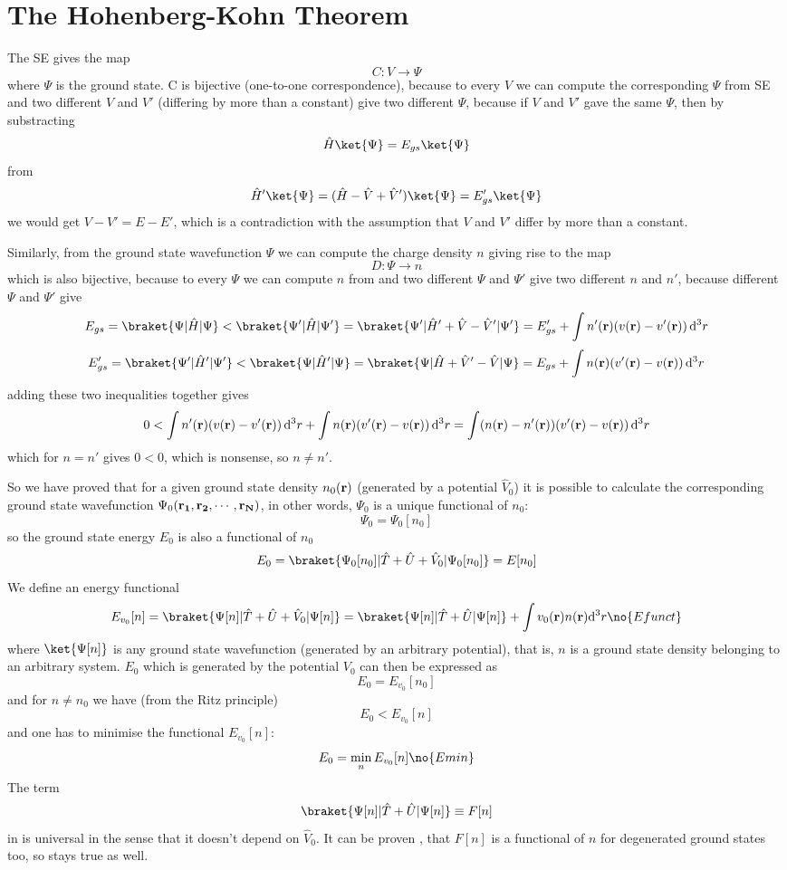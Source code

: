 \section{The Hohenberg-Kohn Theorem}

The SE gives the map
$$C: V \to \Psi$$
where $\Psi$ is the ground state.
C is bijective (one-to-one correspondence), because to every $V$ we can compute the corresponding $\Psi$
from SE and two different $V$ and $V'$ (differing by more than a constant) give
two different $\Psi$, because if $V$ and $V'$ gave the same $\Psi$, then by
substracting
$$\hat H\ket{\Psi}=E_{gs}\ket{\Psi}$$
from
$$\hat H'\ket{\Psi}=(\hat H-\hat V+\hat V')\ket{\Psi}=E_{gs}'\ket{\Psi}$$
we would get $V-V'=E-E'$, which is a contradiction with the assumption that $V$
and $V'$ differ by more than a constant.

Similarly, from the ground state wavefunction $\Psi$ we can compute the charge
density $n$ giving rise to the
map
$$D: \Psi \to n$$ which is also bijective, because to every $\Psi$ we can
compute $n$ from  and two different $\Psi$ and $\Psi'$ give
two different $n$ and $n'$, because different $\Psi$ and $\Psi'$ give
$$E_{gs}=\braket{\Psi|\hat H|\Psi}<\braket{\Psi'|\hat H|\Psi'}=
\braket{\Psi'|\hat H'+\hat V-\hat V'|\Psi'}=E_{gs}'+\int n'({\bf r})
(v({\bf r})-v'({\bf r}))\,\d^3 r$$
$$E_{gs}'=\braket{\Psi'|\hat H'|\Psi'}<\braket{\Psi|\hat H'|\Psi}=
\braket{\Psi|\hat H+\hat V'-\hat V|\Psi}=E_{gs}+\int n({\bf r})
(v'({\bf r})-v({\bf r}))\,\d^3 r$$
adding these two inequalities together gives
$$0<\int n'({\bf r}) (v({\bf r})-v'({\bf r}))\,{\rm d}^3 r + 
\int n({\bf r}) (v'({\bf r})-v({\bf r}))\,{\rm d}^3 r=
\int (n({\bf r})-n'({\bf r}))(v'({\bf r})-v({\bf r}))\,{\rm d}^3 r$$
which for $n=n'$ gives $0<0$, which is nonsense, so $n\neq n'$.

So we have proved that for a given ground state density $n_0({\bf r})$
(generated by a potential $\hat V_0$)
it is possible to calculate the corresponding ground state wavefunction
$\Psi_0({\bf r_1},{\bf r_2},\cdots,{\bf r_N})$, in other words,
$\Psi_0$ is a unique functional of $n_0$:
$$\Psi_0=\Psi_0[n_0]$$
so the ground state energy $E_0$ is also a functional of $n_0$
$$E_0=\braket{\Psi_0[n_0]|\hat T+\hat U+\hat V_0|\Psi_0[n_0]}=E[n_0]$$
We define an energy functional
$$E_{v_0}[n]=\braket{\Psi[n]|\hat T+\hat U+\hat V_0|\Psi[n]}=
\braket{\Psi[n]|\hat T+\hat U|\Psi[n]}+\int v_0({\bf r})n({\bf r})\d^3r
\no{Efunct}$$
where $\ket{\Psi[n]}$ is any ground state wavefunction (generated by an
arbitrary potential), that is, $n$ is a ground state density belonging to an
arbitrary system. $E_0$ which is generated by the potential $V_0$ can then be
expressed as
$$E_0=E_{v_0}[n_0]$$
and for $n\neq n_0$ we have (from the Ritz principle)
$$E_0<E_{v_0}[n]$$
and one has to minimise the functional $E_{v_0}[n]$:
$$E_0=\min_n E_{v_0}[n]\no{Emin}$$
The term 
$$\braket{\Psi[n]|\hat T+\hat U|\Psi[n]}\equiv F[n]$$
in  is universal in the sense that it doesn't depend on $\hat V_0$.
It can be proven \cite{DFT}, that $F[n]$ is a functional of $n$ for degenerated
ground states too, so  stays true as well.

